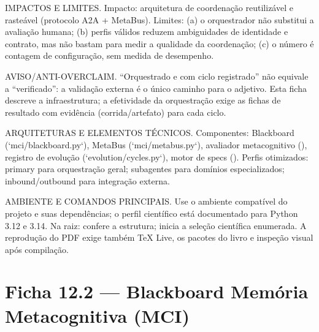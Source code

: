 \begin{limite}
IMPACTOS E LIMITES. Impacto: arquitetura de coordenação reutilizável e
rasteável (protocolo A2A + MetaBus). Limites: (a) o orquestrador não substitui
a avaliação humana; (b) perfis válidos reduzem ambiguidades de identidade e
contrato, mas não bastam para medir a qualidade da coordenação; (c) o número
\CoreAgentCount{} é contagem de configuração, sem medida de desempenho.
\end{limite}

\begin{aviso}
AVISO/ANTI-OVERCLAIM. ``Orquestrado e com ciclo registrado'' não equivale a
``verificado'': a validação externa é o único caminho para o adjetivo. Esta
ficha descreve a infraestrutura; a efetividade da orquestração exige as fichas
de resultado com evidência (corrida/artefato) para cada ciclo.
\end{aviso}

\begin{arquitetura}
ARQUITETURAS E ELEMENTOS TÉCNICOS. Componentes: Blackboard
(`mci/blackboard.py`), MetaBus (`mci/metabus.py`), avaliador metacognitivo
(), registro de evolução
(`evolution/cycles.py`), motor de specs ().
Perfis otimizados: primary para orquestração geral; subagentes para domínios
especializados; inbound/outbound para integração externa.
\end{arquitetura}

\begin{processo}
AMBIENTE E COMANDOS PRINCIPAIS. Use o ambiente compatível do projeto e
suas dependências; o perfil científico está documentado para Python 3.12 e
3.14. Na raiz:  confere a estrutura;
inicia a seleção científica enumerada. A reprodução do PDF exige também
TeX Live, os pacotes do livro e inspeção visual após compilação.
\end{processo}

\section{Ficha 12.2 — Blackboard Memória Metacognitiva (MCI)}


